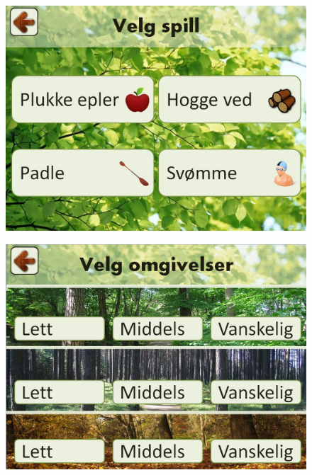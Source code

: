 \begin{figure} [H]
\centering
\includegraphics[scale=0.2]{VelgSpill.jpg}
\label{velgSpillNorsk}
\end{figure}
\begin{figure} [H]
\centering
\includegraphics[scale=0.2]{VelgOmgivelser.jpg}
\label{fig:omgivelseNivaaNorsk}
\end{figure}


